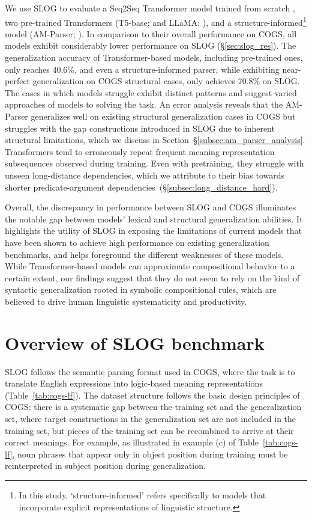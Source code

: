 We use SLOG to evaluate a Seq2Seq Transformer model trained from scratch \citep{NIPS2017_3f5ee243}, two pre-trained Transformers (T5-base; \citealt{2020t5} and LLaMA; \citealt{touvron2023llama}), and a structure-informed\footnote{In this study, `structure-informed' refers specifically to models that incorporate explicit representations of linguistic structure.} model (AM-Parser; \citealt{weissenhorn-etal-2022-compositional}). In comparison to their overall performance on COGS, all models exhibit considerably lower performance on SLOG (\S\ref{sec:slog_res}). The generalization accuracy of Transformer-based models, including pre-trained ones, only reaches 40.6\%, and even a structure-informed parser, while exhibiting near-perfect generalization on COGS structural cases, only achieves 70.8\% on SLOG. The cases in which models struggle exhibit distinct patterns and suggest varied approaches of models to solving the task. An error analysis reveals that the AM-Parser generalizes well on existing structural generalization cases in COGS but struggles with the gap constructions introduced in SLOG due to inherent structural limitations, which we discuss in Section~\S\ref{subsec:am_parser_analysis}. Transformers tend to erroneously repeat frequent meaning representation subsequences observed during training. Even with pretraining, they struggle with unseen long-distance dependencies, which we attribute to their bias towards shorter predicate-argument dependencies~(\S\ref{subsec:long_distance_hard}). 

Overall, the discrepancy in performance between SLOG and COGS illuminates the notable gap between models' lexical and structural generalization abilities. It highlights the utility of SLOG in exposing the limitations of current models that have been shown to achieve high performance on existing generalization benchmarks, and helps foreground the different weaknesses of these models. While Transformer-based models can approximate compositional behavior to a certain extent, our findings suggest that they do not seem to rely on the kind of syntactic generalization rooted in symbolic compositional rules, which are believed to drive human linguistic systematicity and productivity. 


\section{Overview of SLOG benchmark} \label{sec:slog_dataset}
SLOG follows the semantic parsing format used in COGS, where the task is to translate English expressions into logic-based meaning representations (Table~\ref{tab:cogs-lf}). The dataset structure follows the basic design principles of COGS: there is a systematic gap between the training set and the generalization set, where target constructions in the generalization set are not included in the training set, but pieces of the training set can be recombined to arrive at their correct meanings. For example, as illustrated in example (c) of Table~\ref{tab:cogs-lf}, noun phrases that appear only in object position during training must be reinterpreted in subject position during generalization. 


